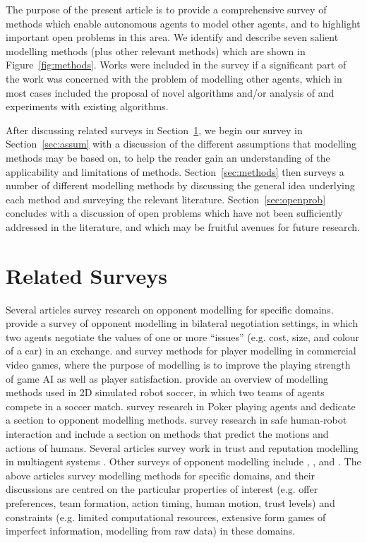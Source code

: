 \documentclass[final,1p,times,authoryear]{elsarticle}
\begin{document}
The purpose of the present article is to provide a comprehensive survey of methods which enable autonomous agents to model other agents, and to highlight important open problems in this area. We identify and describe seven salient modelling methods (plus other relevant methods) which are shown in Figure~\ref{fig:methods}. Works were included in the survey if a significant part of the work was concerned with the problem of modelling other agents, which in most cases included the proposal of novel algorithms and/or analysis of and experiments with existing algorithms.

After discussing related surveys in Section~\ref{sec:relwork}, we begin our survey in Section~\ref{sec:assum} with a discussion of the different assumptions that modelling methods may be based on, to help the reader gain an understanding of the applicability and limitations of methods. Section~\ref{sec:methods} then surveys a number of different modelling methods by discussing the general idea underlying each method and surveying the relevant literature. Section~\ref{sec:openprob} concludes with a discussion of open problems which have not been sufficiently addressed in the literature, and which may be fruitful avenues for future research.


	\section{Related Surveys} \label{sec:relwork}

Several articles survey research on opponent modelling for specific domains. \citet{bhhj2016} provide a survey of opponent modelling in bilateral negotiation settings, in which two agents negotiate the values of one or more ``issues'' (e.g. cost, size, and colour of a car) in an exchange. \citet{bsl2012} and \citet{kzc2014} survey methods for player modelling in commercial video games, where the purpose of modelling is to improve the playing strength of game AI as well as player satisfaction. \citet{pd2012} provide an overview of modelling methods used in 2D simulated robot soccer, in which two teams of agents compete in a soccer match. \citet{rw2011poker} survey research in Poker playing agents and dedicate a section to opponent modelling methods. \citet{lfs2014} survey research in safe human-robot interaction and include a section on methods that predict the motions and actions of humans. Several articles survey work in trust and reputation modelling in multiagent systems \citep[e.g.][]{ps2013,yslml2013,rhj2004}. Other surveys of opponent modelling include \citet{hds2005}, \citet{om2005}, and \citet{f2001}. The above articles survey modelling methods for specific domains, and their discussions are centred on the particular properties of interest (e.g. offer preferences, team formation, action timing, human motion, trust levels) and constraints (e.g. limited computational resources, extensive form games of imperfect information, modelling from raw data) in these domains.
\end{document}
